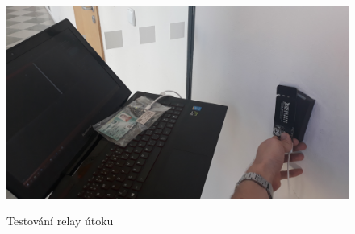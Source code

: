 \begin{figure}[ht]\centering
  \centering
  \includegraphics[width=\linewidth]{obrazky-figures/obrazekPokusRelay.jpg}\\[1pt]  
  \caption{Testování relay útoku}    
  \label{obrazekPokusRelay}
\end{figure}

